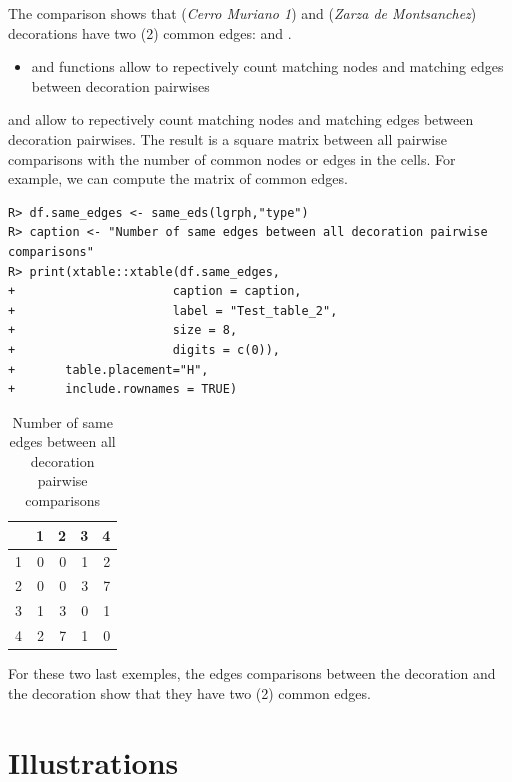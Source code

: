 \documentclass[article]{jss}\usepackage{knitr}
\begin{document}
The comparison shows that  (\emph{Cerro Muriano 1}) and  (\emph{Zarza de Montsanchez}) decorations have two (2) common edges:  and .

\begin{itemize}
\setlength\itemsep{.1em}
  \item {} and  functions allow to repectively count matching nodes and matching edges between decoration pairwises
\end{itemize}

 and  allow to repectively count matching nodes and matching edges between decoration pairwises. The result is a square matrix between all pairwise comparisons with the number of common nodes or edges in the cells. For example, we can compute the matrix of common edges.

\begin{kframe}
\begin{verbatim}
R> df.same_edges <- same_eds(lgrph,"type")
R> caption <- "Number of same edges between all decoration pairwise comparisons"
R> print(xtable::xtable(df.same_edges,
+                      caption = caption,
+                      label = "Test_table_2",
+                      size = 8,
+                      digits = c(0)),
+       table.placement="H",
+       include.rownames = TRUE)
\end{verbatim}
\end{kframe}%
\begin{table}[H]
\centering
\begin{tabular}{rrrrr}
  \hline
 & 1 & 2 & 3 & 4 \\ 
  \hline
1 & 0 & 0 & 1 & 2 \\ 
  2 & 0 & 0 & 3 & 7 \\ 
  3 & 1 & 3 & 0 & 1 \\ 
  4 & 2 & 7 & 1 & 0 \\ 
   \hline
\end{tabular}
\caption{Number of same edges between all decoration pairwise comparisons} 
\label{Test_table_2}
\end{table}


For these two last exemples, the edges comparisons between the decoration  and the decoration  show that they have two (2) common edges.

\section{Illustrations} \label{sec:illustrations}
\end{document}
